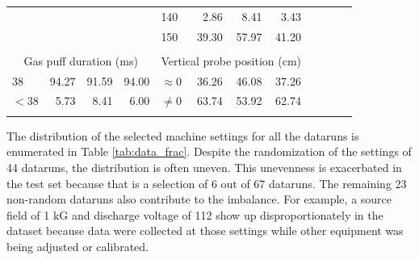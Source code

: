 \begin{table}
\begin{tabular}{lrrr|lrrr|lrrr}
                      & & & & 140 & 2.86 & 8.41 & 3.43     &                       & & & \\
                      & & & & 150 & 39.30 & 57.97 & 41.20  &                       & & & \\
		\\
		\multicolumn{4}{c|}{Gas puff duration (ms)} & \multicolumn{4}{c}{Vertical probe position (cm)}\\
		\cline{0-7} \cline{0-7}
		$38$ & 94.27 & 91.59 & 94.00 & $\approx 0$ & 36.26 & 46.08 & 37.26 & \\
		$<38$ & 5.73 & 8.41 & 6.00    & $\neq 0$ & 63.74 & 53.92 & 62.74    & \\
		\multicolumn{12}{l}{}
	\end{tabular}
\end{table}


The distribution of the selected machine settings for all the dataruns is enumerated in Table \ref{tab:data_frac}. Despite the randomization of the settings of 44 dataruns, the distribution is often uneven. This unevenness is exacerbated in the test set because that is a selection of 6 out of 67 dataruns. The remaining 23 non-random dataruns also contribute to the imbalance. For example, a source field of 1 kG and discharge voltage of 112 show up disproportionately in the dataset because data were collected at those settings while other equipment was being adjusted or calibrated.



